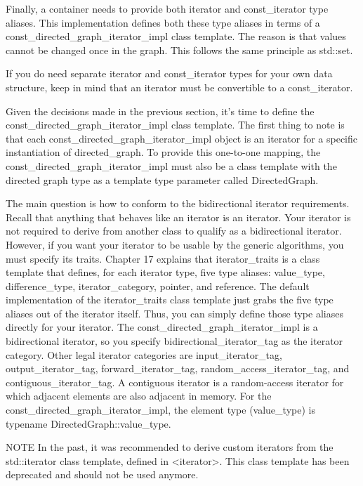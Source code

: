 Finally, a container needs to provide both iterator and const\_iterator type aliases. This implementation defines both these type aliases in terms of a const\_directed\_graph\_iterator\_impl class template. The reason is that values cannot be changed once in the graph. This follows the same principle as std::set.

If you do need separate iterator and const\_iterator types for your own data structure, keep in mind that an iterator must be convertible to a const\_iterator.


Given the decisions made in the previous section, it’s time to define the const\_directed\_graph\_iterator\_impl class template. The first thing to note is that each const\_directed\_graph\_iterator\_impl object is an iterator for a specific instantiation of directed\_graph. To provide this one-to-one mapping, the const\_directed\_graph\_iterator\_impl must also be a class template with the directed graph type as a template type parameter called DirectedGraph.

The main question is how to conform to the bidirectional iterator requirements. Recall that anything that behaves like an iterator is an iterator. Your iterator is not required to derive from another class to qualify as a bidirectional iterator. However, if you want your iterator to be usable by the generic algorithms, you must specify its traits. Chapter 17 explains that iterator\_traits is a class template that defines, for each iterator type, five type aliases: value\_type, difference\_type, iterator\_category, pointer, and reference. The default implementation of the iterator\_traits class template just grabs the five type aliases out of the iterator itself. Thus, you can simply define those type aliases directly for your iterator. The const\_directed\_graph\_iterator\_impl is a bidirectional iterator, so you specify bidirectional\_iterator\_tag as the iterator category. Other legal iterator categories are input\_iterator\_tag, output\_iterator\_tag, forward\_iterator\_tag, random\_access\_iterator\_tag, and contiguous\_iterator\_tag. A contiguous iterator is a random-access iterator for which adjacent elements are also adjacent in memory. For the const\_directed\_graph\_iterator\_impl, the element type (value\_type) is typename DirectedGraph::value\_type.

\begin{myNotic}{NOTE}
In the past, it was recommended to derive custom iterators from the std::iterator class template, defined in <iterator>. This class template has been deprecated and should not be used anymore.
\end{myNotic}

